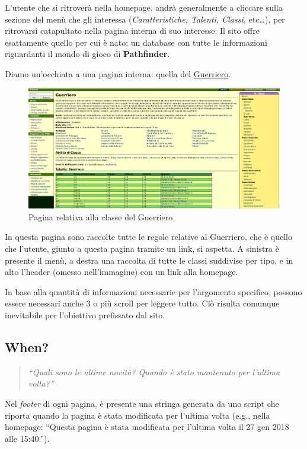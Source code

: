 L'utente che si ritroverà nella homepage, andrà generalmente a cliccare sulla sezione del menù che gli interessa (\emph{Caratteristiche, %
Talenti, Classi,} etc\dots), per ritrovarsi catapultato nella pagina interna di suo interesse. Il sito offre esattamente quello
per cui è nato: un database con tutte le informazioni riguardanti il mondo di gioco di \textbf{Pathfinder}.

\newpage
Diamo un'occhiata a una pagina interna: quella del \href{http://golarion.altervista.org/wiki/Guerriero}{Guerriero}.

\begin{figure}[hbt]
    \centering
    \includegraphics[width=\textwidth]{img/guerriero.png}
    \caption{Pagina relativa alla classe del Guerriero.}
    \label{fig:guerriero}
\end{figure}

In questa pagina sono raccolte tutte le regole relative al Guerriero, che è quello che l'utente, giunto a questa pagina tramite un link, si aspetta.
A sinistra è presente il menù, a destra una raccolta di tutte le classi suddivise per tipo, e in alto l'header (omesso nell'immagine) 
con un link alla homepage.\par
In base alla quantità di informazioni necessarie per l'argomento specifico, possono essere necessari anche 3 o più
scroll per leggere tutto. Ciò risulta comunque inevitabile per l'obiettivo prefissato dal sito.

\clearpage

\subsection{When?}
\begin{quote}
    \emph{``Quali sono le ultime novità? Quando è stato mantenuto per l'ultima volta?''}
\end{quote}

Nel \emph{footer} di ogni pagina, è presente una stringa generata da uno script che riporta quando la pagina è stata 
modificata per l'ultima volta (e.g., nella homepage: ``Questa pagina è stata modificata per l'ultima volta il 27 gen 2018 alle 15:40.'').

